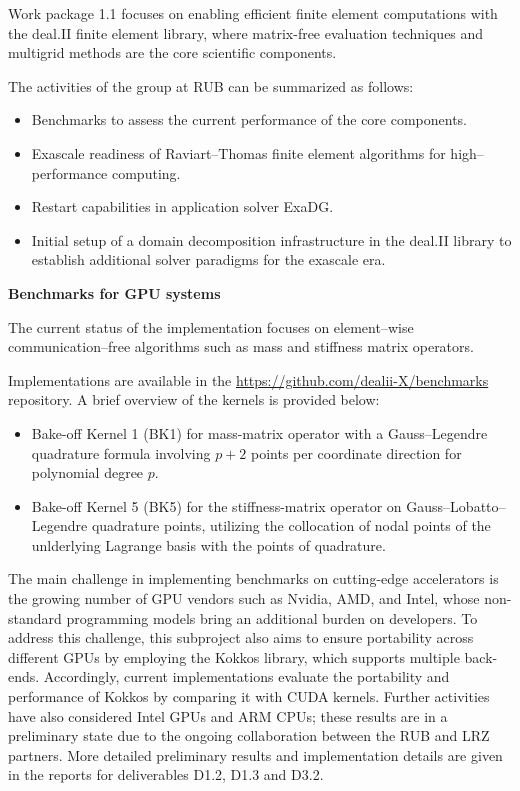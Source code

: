 \documentclass[a4paper,12pt, numbers]{article}
\begin{document}
Work package 1.1 focuses on enabling efficient finite element computations
with the deal.II finite element library, where matrix-free evaluation
techniques and multigrid methods are the core scientific components.

The activities of the group at RUB can be summarized as follows:
\begin{itemize}
	\item Benchmarks to assess the current performance of the core components.
	\item Exascale readiness of Raviart--Thomas finite element algorithms for high--performance computing.
	\item Restart capabilities in application solver ExaDG.
	\item Initial setup of a domain decomposition infrastructure in the deal.II library to establish additional solver paradigms for the exascale era.
\end{itemize}



\noindent\textbf{Benchmarks for GPU systems}

The current status of the implementation focuses on element--wise communication--free algorithms such as mass and stiffness matrix operators. 

Implementations are available in the \url{https://github.com/dealii-X/benchmarks} repository. A brief overview of the kernels is provided below:
\begin{itemize}
	\item Bake-off Kernel 1 (BK1) for mass-matrix operator with a Gauss--Legendre quadrature formula involving $p+2$ points per coordinate direction for polynomial degree $p$.
	\item Bake-off Kernel 5 (BK5) for the stiffness-matrix operator on Gauss--Lobatto--Legendre quadrature points, utilizing the collocation of nodal points of the unlderlying Lagrange basis with the points of quadrature.
\end{itemize}

The main challenge in implementing benchmarks on cutting-edge accelerators is the growing number of GPU vendors such as Nvidia, AMD, and Intel, whose non-standard programming models bring an additional burden on developers. To address this challenge, this subproject also aims to ensure portability across different GPUs by employing the Kokkos library, which supports multiple back-ends. Accordingly, current implementations evaluate the portability and performance of Kokkos by comparing it with CUDA kernels.
Further activities have also considered Intel GPUs and ARM CPUs; these results
are in a preliminary state due to the ongoing collaboration between the RUB
and LRZ partners. More detailed preliminary results and implementation details are given in the reports for deliverables D1.2, D1.3 and D3.2.
\end{document}
